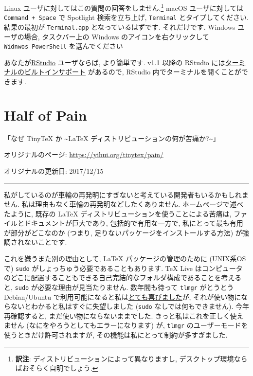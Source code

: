 \documentclass[
  xelatex,ja=standard,jafont=noto]{bxjsreport}
\begin{document}
Linux ユーザに対してはこの質問の回答をしません.\footnote{\textbf{訳注}:
  ディストリビューションによって異なりますし,
  デスクトップ環境ならばおそらく自明でしょう.} macOS ユーザに対しては
\texttt{Command\ +\ Space} で Spotlight 検索を立ち上げ,
\texttt{Terminal} とタイプしてください. 結果の最初が
\texttt{Terminal.app} となっているはずです. それだけです. Windows
ユーザの場合, タスクバー上の Windows のアイコンを右クリックして
\texttt{Widnwos\ PowerShell} を選んでください

あなたが\href{https://www.rstudio.com}{RStudio} ユーザならば,
より簡単です. v1.1 以降の RStudio
には\href{https://blog.rstudio.com/2017/08/11/rstudio-v1-1-preview-terminal/}{ターミナルのビルトインサポート}
があるので, RStudio 内でターミナルを開くことができます.

\hypertarget{pain}{%
\chapter{Half of Pain}\label{pain}}

「なぜ TinyTeX か \textasciitilde LaTeX
ディストリビューションの何が苦痛か?\textasciitilde」

オリジナルのページ: \url{https://yihui.org/tinytex/pain/}

オリジナルの更新日: 2017/12/15

\begin{center}\rule{0.5\linewidth}{0.5pt}\end{center}

私がしているのが車輪の再発明にすぎないと考えている開発者もいるかもしれません.
私は理由もなく車輪の再発明などしたくありません.
ホームページで述べたように, 既存の LaTeX
ディストリビューションを使うことによる苦痛は,
ファイルとドキュメントが巨大であり, 包括的で有用な一方で,
私にとって最も有用が部分がどこなのか (つまり,
足りないパッケージをインストールする方法) が強調されないことです.

これを嫌うまた別の理由として, LaTeX パッケージの管理のために
(UNIX系OSで) \texttt{sudo} がしょっちゅう必要であることもあります. TeX
Live
はコンピュータのどこに配置することもできる自己完結的なフォルダ構成であることを考えると,
\texttt{sudo} が必要な理由が見当たりません. 数年間も待って
\texttt{tlmgr} がとうとう Debian/Ubuntu
で利用可能になると私は\href{https://twitter.com/xieyihui/status/397238590523973632}{とても喜びました}が,
それが使い物にならないとわかると私はすぐに失望しました (\texttt{sudo}
なしでは何もできません). 今年再確認すると,
まだ使い物にならないままでした. きっと私はこれを正しく使えません
(なにをやろうとしてもエラーになります) が, \texttt{tlmgr}
のユーザーモードを使うときだけ許可されますが,
その機能は私にとって制約が多すぎました.
\end{document}
